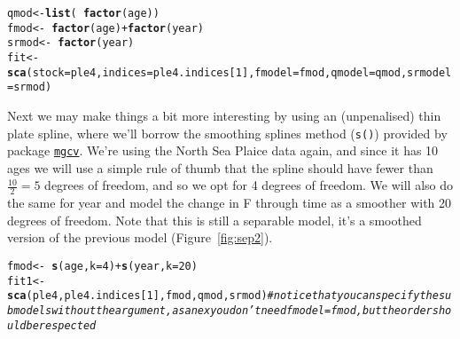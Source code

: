 \documentclass[a4paper,english,10pt]{article}\usepackage[]{graphicx}\usepackage[]{color}
\makeatletter
\newcommand{\hlnum}[1]{\textcolor[rgb]{0.686,0.059,0.569}{#1}}%
\newcommand{\hlcom}[1]{\textcolor[rgb]{0.678,0.584,0.686}{\textit{#1}}}%
\newcommand{\hlopt}[1]{\textcolor[rgb]{0,0,0}{#1}}%
\newcommand{\hlstd}[1]{\textcolor[rgb]{0.345,0.345,0.345}{#1}}%
\newcommand{\hlkwb}[1]{\textcolor[rgb]{0.69,0.353,0.396}{#1}}%
\newcommand{\hlkwc}[1]{\textcolor[rgb]{0.333,0.667,0.333}{#1}}%
\newcommand{\hlkwd}[1]{\textcolor[rgb]{0.737,0.353,0.396}{\textbf{#1}}}%
\newenvironment{kframe}{%
 \def\at@end@of@kframe{}%
 \ifinner\ifhmode%
  \def\at@end@of@kframe{\end{minipage}}%
  \begin{minipage}{\columnwidth}%
 \fi\fi%
 \def\FrameCommand##1{\hskip\@totalleftmargin \hskip-\fboxsep
 \colorbox{shadecolor}{##1}\hskip-\fboxsep
     \hskip-\linewidth \hskip-\@totalleftmargin \hskip\columnwidth}%
 \MakeFramed {\advance\hsize-\width
   \@totalleftmargin\z@ \linewidth\hsize
   \@setminipage}}%
 {\par\unskip\endMakeFramed%
 \at@end@of@kframe}
\newenvironment{knitrout}{}{} %
\newcommand{\code}[1]{{\texttt{#1}}}
\newcommand{\pkg}[1]{{\texttt{#1}}}
\makeatother
\begin{document}
\begin{knitrout}
\color{fgcolor}\begin{kframe}
\begin{alltt}
\hlstd{qmod} \hlkwb{<-} \hlkwd{list}\hlstd{(}\hlopt{~} \hlkwd{factor}\hlstd{(age))}
\hlstd{fmod} \hlkwb{<-} \hlopt{~} \hlkwd{factor}\hlstd{(age)} \hlopt{+} \hlkwd{factor}\hlstd{(year)}
\hlstd{srmod} \hlkwb{<-} \hlopt{~} \hlkwd{factor}\hlstd{(year)}
\hlstd{fit} \hlkwb{<-} \hlkwd{sca}\hlstd{(}\hlkwc{stock} \hlstd{= ple4,} \hlkwc{indices} \hlstd{= ple4.indices[}\hlnum{1}\hlstd{],} \hlkwc{fmodel}\hlstd{=fmod,} \hlkwc{qmodel}\hlstd{=qmod,} \hlkwc{srmodel}\hlstd{=srmod)}
\end{alltt}


{\ttfamily\noindent\bfseries{}}\end{kframe}
\end{knitrout}

\begin{knitrout}
\color{fgcolor}\begin{kframe}


{\ttfamily\noindent\bfseries{}}\end{kframe}
\end{knitrout}

Next we may make things a bit more interesting by using an (unpenalised) thin plate spline, where we'll borrow the smoothing splines method (\code{s()}) provided by package \href{http://cran.r-project.org/web/packages/mgcv/}{\pkg{mgcv}}. We're using the North Sea Plaice data again, and since it has 10 ages we will use a simple rule of thumb that the spline should have fewer than $\frac{10}{2} = 5$ degrees of freedom, and so we opt for 4 degrees of freedom. We will also do the same for year and model the change in F through time as a smoother with 20 degrees of freedom. Note that this is still a separable model, it's a smoothed version of the previous model (Figure~\ref{fig:sep2}).

\begin{knitrout}
\color{fgcolor}\begin{kframe}
\begin{alltt}
\hlstd{fmod} \hlkwb{<-} \hlopt{~} \hlkwd{s}\hlstd{(age,} \hlkwc{k}\hlstd{=}\hlnum{4}\hlstd{)} \hlopt{+} \hlkwd{s}\hlstd{(year,} \hlkwc{k} \hlstd{=} \hlnum{20}\hlstd{)}
\hlstd{fit1} \hlkwb{<-} \hlkwd{sca}\hlstd{(ple4, ple4.indices[}\hlnum{1}\hlstd{], fmod, qmod, srmod)} \hlcom{# notice that you can specify the submodels without the argument, as an ex you don't need fmodel=fmod, but the order should be respected}
\end{alltt}


{\ttfamily\noindent\bfseries{}}\end{kframe}
\end{knitrout}
\end{document}
